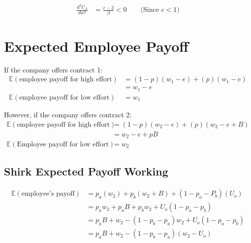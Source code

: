 \documentclass[a4paper, 12pt]{article}
\begin{document}
\begin{appendices}
\begin{align*}
    \frac{d^2U_A}{dw^2} &= \frac{c-2}{\beta} < 0 \qquad \text{(Since $c < 1$)}
\end{align*}

\section{Expected Employee Payoff}\label{app:expected-working}
If the company offers contract 1:
\begin{align*}
    \mathbb{E}(\text{employee payoff for high effort})& = (1-p)( w_1-e) + (p)(w_1-e) \\
    & = w_1 - e \\
    \mathbb{E}(\text{employee payoff for low effort})& = w_1 
\end{align*}

However, if the company offers contract 2:
\begin{align*}
    \mathbb{E}(\text{employee payoff for high effort})& = (1-p)( w_2-e) + (p)(w_2-e+B) \\
    & = w_2 - e + pB\\
    \mathbb{E}(\text{Employee payoff for low effort})& = w_2
\end{align*}

\subsection{Shirk Expected Payoff Working}
\begin{align*}
    \mathbb{E}(\text{employee's payoff}) & = p_a(w_2) + p_b(w_2 + B) + (1-p_a-P_b)(U_o) \\
    & = p_aw_2 + p_aB + p_bw_2 + U_o(1-p_a-p_b) \\
    & = p_aB + w_2 - (1-p_b-p_a)w_2 + U_o(1-p_a-p_b)\\
    & = p_aB + w_2 - (1-p_b-p_a)(w_2-U_o)  
\end{align*}
\end{appendices}
\end{document}
